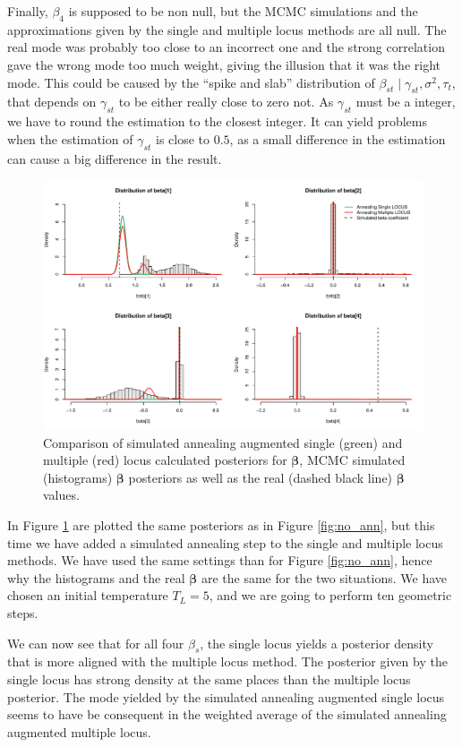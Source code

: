 \documentclass[a4paper, 11pt]{report}
\numberwithin{equation}{chapter}
\begin{document}
Finally, $\beta_4$ is supposed to be non null, but the MCMC simulations and the approximations given by the single and multiple locus methods are all null. The real mode was probably too close to an incorrect one and the strong correlation gave the wrong mode too much weight, giving the illusion that it was the right mode. This could be caused by the ``spike and slab'' distribution of $\beta_{st}\mid \gamma_{st}, \sigma^2, \tau_t$, that depends on $\gamma_{st}$ to be either really close to zero not. As $\gamma_{st}$ must be a integer, we have to round the estimation to the closest integer. It can yield problems when the estimation of $\gamma_{st}$ is close to $0.5$, as a small difference in the estimation can cause a big difference in the result.

\begin{figure}[h]
\includegraphics[width=\textwidth, bb=0 0 800px 600px]{images/annealing.pdf}
\caption{\label{fig:ann}Comparison of simulated annealing augmented single (green) and multiple (red) locus calculated posteriors for $\boldsymbol{\beta}$, MCMC simulated (histograms) $\boldsymbol{\beta}$ posteriors as well as the real (dashed black line) $\boldsymbol{\beta}$ values.}
\end{figure}
In Figure \ref{fig:ann} are plotted the same posteriors as in Figure \ref{fig:no_ann}, but this time we have added a simulated annealing step to the 
single and multiple locus methods. We have used the same settings than for Figure \ref{fig:no_ann}, hence why the histograms and the real $
\boldsymbol{\beta}$ are the same for the two situations. We have chosen an initial temperature $T_L = 5$, and we are going to perform ten geometric steps.

We can now see that for all four $\beta_s$, the single locus yields a posterior density that is more aligned with the multiple locus method. The posterior given by the single locus has strong density at the same places than the multiple locus posterior. The mode yielded by the simulated annealing augmented single locus seems to have be consequent in the weighted average of the simulated annealing augmented multiple locus.
\end{document}
